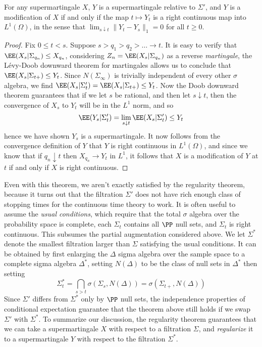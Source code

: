 \begin{theorem}
    For any supermartingale $X$, $Y$ is a supermartingale relative to $\Sigma'$, and $Y$ is a modification of $X$ if and only if the map $t \mapsto Y_t$ is a right continuous map into $L^1(\Omega)$, in the sense that $\lim_{s \downarrow t} \| Y_t - Y_s \|_1 = 0$ for all $t \geq 0$.
\end{theorem}
\begin{proof}
    Fix $0 \leq t < s$. Suppose $s > q_1 > q_2 > \dots \to t$. It is easy to verify that $\EE(X_s|\Sigma_{q_n}) \leq X_{q_n}$, considering $Z_n = \EE(X_s|\Sigma_{q_n})$ as a reverse {\it martingale}, the L\'{e}vy-Doob downward theorem for martingales allows us to conclude that $\EE(X_s|\Sigma_{t+}) \leq Y_t$. Since $N(\Sigma_\infty)$ is trivially independent of every other $\sigma$ algebra, we find $\EE(X_s|\Sigma'_t) = \EE(X_s|\Sigma_{t+}) \leq Y_t$. Now the Doob downward theorem guarantees that if we let $s$ be rational, and then let $s \downarrow t$, then the convergence of $X_s$ to $Y_t$ will be in the $L^1$ norm, and so
    \[ \EE(Y_s|\Sigma'_t) = \lim_{s \downarrow t} \EE(X_s|\Sigma'_t) \leq Y_t \]
    hence we have shown $Y_s$ is a supermartingale. It now follows from the convergence definition of $Y$ that $Y$ is right continuous in $L^1(\Omega)$, and since we know that if $q_n \downarrow t$ then $X_{q_n} \to Y_t$ in $L^1$, it follows that $X$ is a modification of $Y$ at $t$ if and only if $X$ is right continuous.
\end{proof}

Even with this theorem, we aren't exactly satisfied by the regularity theorem, because it turns out that the filtration $\Sigma'$ does not have rich enough class of stopping times for the continuous time theory to work. It is often useful to assume the {\it usual conditions}, which require that the total $\sigma$ algebra over the probability space is complete, each $\Sigma_t$ contains all $\PP$ null sets, and $\Sigma_t$ is right continuous. This subsumes the partial augmentation considered above. We let $\Sigma^*$ denote the smallest filtration larger than $\Sigma$ satisfying the usual conditions. It can be obtained by first enlarging the $\Delta$ sigma algebra over the sample space to a complete sigma algebra $\Delta^*$, setting $N(\Delta)$ to be the class of null sets in $\Delta^*$ then setting
%
\[ \Sigma^*_t = \bigcap_{s > t} \sigma(\Sigma_s, N(\Delta)) = \sigma(\Sigma_{t+}, N(\Delta)) \]
%
Since $\Sigma'$ differs from $\Sigma^*$ only by $\PP$ null sets, the independence properties of conditional expectation guarantee that the theorem above still holds if we swap $\Sigma'$ with $\Sigma^*$. To summarize our discussion, the regularity theorem guarantees that we can take a supermartingale $X$ with respect to a filtration $\Sigma$, and {\it regularize} it to a \cadlag supermartingale $Y$ with respect to the filtration $\Sigma^*$.

